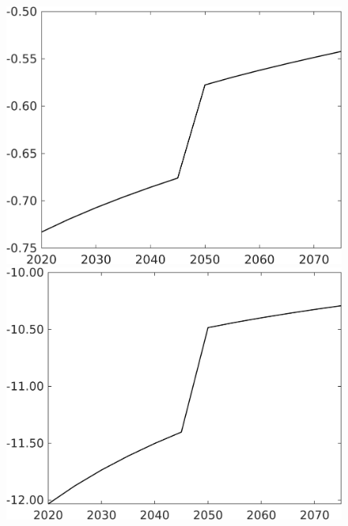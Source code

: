 \documentclass[12pt]{article}
\begin{document}
\begin{figure}[h!!]
\begin{minipage}[]{0.32\textwidth}
	\end{minipage}	
	\begin{minipage}[]{0.32\textwidth}
		\includegraphics[width=1\textwidth]{../../codding_model/own_basedOnFried/optimalPol_010922_revision/figures/all_13Sept22/CompTaufPER_bytaul_Reg0_Lf_spillover0_nsk1_xgr0_knspil0_sep0_LFlimit1_emsbase0_countec0_GovRev0_etaa0.79_lgd0.png}
	\end{minipage}		
	\begin{minipage}[]{0.32\textwidth}
		\includegraphics[width=1\textwidth]{../../codding_model/own_basedOnFried/optimalPol_010922_revision/figures/all_13Sept22/CompTaufPER_bytaul_Reg0_Lg_spillover0_nsk1_xgr0_knspil0_sep0_LFlimit1_emsbase0_countec0_GovRev0_etaa0.79_lgd0.png}

\end{minipage}
\end{figure}
\end{document}
